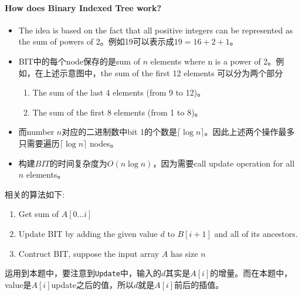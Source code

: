 \paragraph{How does Binary Indexed Tree work?}
\begin{itemize}
\item The idea is based on the fact that all positive integers can be represented as the sum of powers of 2。例如19可以表示成$19=16+2+1$。
\item BIT中的每个node保存的是sum of $n$ elements where n is a power of 2。例如，在上述示意图中，the sum of the first 12 elements 可以分为两个部分
\begin{enumerate}
\item The sum of the last 4 elements (from 9 to 12)。
\item The sum of the first 8 elements (from 1 to 8)。
\end{enumerate}
\item 而number $ n$对应的二进制数中bit 1的个数是$ \lceil\log n\rceil $。因此上述两个操作最多只需要遍历$ \lceil\log n\rceil $ nodes。
\item 构建$BIT$的时间复杂度为$ O(n\log n) $，因为需要call update operation for all $ n $ elements。
\end{itemize}
相关的算法如下:
\begin{enumerate}
\item Get sum of $A[0\ldots i]$
\item Update BIT by adding the given value $ d $ to $B[i+1]$ and all of its ancestors.
\item Contruct BIT, suppose the input array $A$ has size $ n $
\end{enumerate}
运用到本题中，要注意到\texttt{Update}中，输入的$d$其实是$A[i]$的增量。而在本题中，value是$A[i]$update之后的值，所以$d$就是$ A[i] $前后的插值。
\setcounter{lstlisting}{0}

